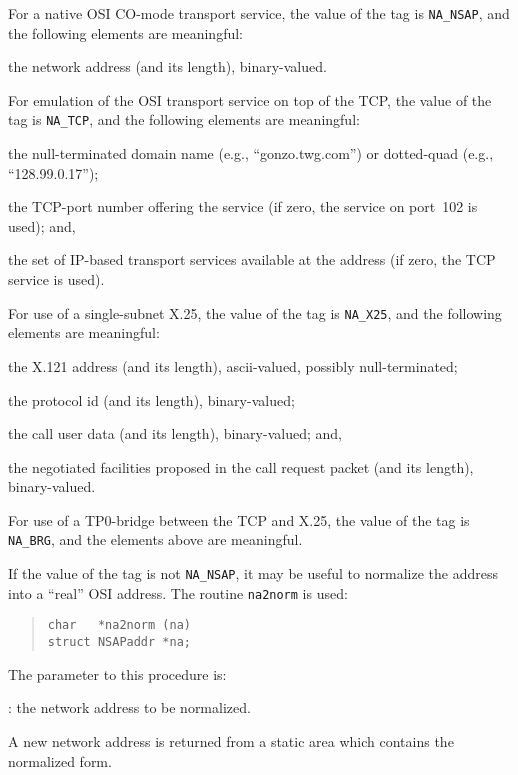 For a native OSI CO-mode transport service,
the value of the tag is \verb"NA_NSAP",
and the following elements are meaningful:
\begin{describe}
\item[\verb"na\_address"/\verb"na\_addrlen":] the network address
(and its length), binary-valued.
\end{describe}

For emulation of the OSI transport service on top of the TCP,
the value of the tag is \verb"NA_TCP",
and the following elements are meaningful:
\begin{describe}
\item[\verb"na\_domain":] the null-terminated domain name
(e.g., ``gonzo.twg.com'') or dotted-quad (e.g., ``128.99.0.17'');

\item[\verb"na\_port":] the TCP-port number offering the service
(if zero, the service on port~102 is used);
and,

\item[\verb"na\_tset":] the set of IP-based transport services available at
the address
(if zero, the TCP service is used).
\end{describe}

For use of a single-subnet X.25,
the value of the tag is \verb"NA_X25",
and the following elements are meaningful:
\begin{describe}
\item[\verb"na\_dte"/\verb"na\_dtelen":] the X.121 address (and its length),
ascii-valued, possibly null-terminated;

\item[\verb"na\_pid"/\verb"na\_pidlen":] the protocol id (and its length),
binary-valued;

\item[\verb"na\_cudf"/\verb"na\_cudflen":] the call user data (and its length),
binary-valued;
and,

\item[\verb"na\_fac"/\verb"na\_faclen":] the negotiated facilities proposed
in the call request packet (and its length),
binary-valued.
\end{describe}
For use of a TP0-bridge between the TCP and X.25,
the value of the tag is \verb"NA_BRG",
and the elements above are meaningful.

If the value of the tag is not \verb"NA_NSAP",
it may be useful to normalize the address into a ``real'' OSI address.
The routine \verb"na2norm" is used:
\begin{quote}\begin{verbatim}
char   *na2norm (na)
struct NSAPaddr *na;
\end{verbatim}\end{quote}
The parameter to this procedure is:
\begin{describe}
\item[\verb"na"]: the network address to be normalized.
\end{describe}
A new network address is returned from a static area which contains the
normalized form.

